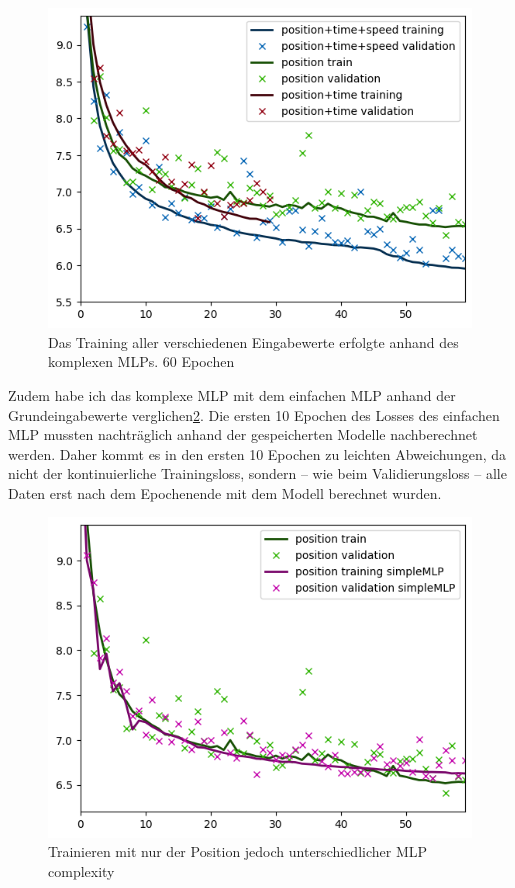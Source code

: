 \documentclass[a4paper]{article}
\begin{document}
    \begin{figure}[h]
        \includegraphics[scale=0.6]{figures/fig6_training_different_input_data}
        \centering
        \caption{Das Training aller verschiedenen Eingabewerte erfolgte anhand des komplexen MLPs. 60 Epochen}
        \label{fig:training_different_input}
    \end{figure}

    Zudem habe ich das komplexe MLP mit dem einfachen MLP anhand der Grundeingabewerte
    verglichen\ref{fig:training_different_complexity}. Die ersten 10 Epochen des Losses des einfachen MLP mussten
    nachträglich anhand der gespeicherten Modelle nachberechnet werden. Daher kommt es in den ersten 10 Epochen zu
    leichten Abweichungen, da nicht der kontinuierliche Trainingsloss, sondern – wie beim Validierungsloss – alle Daten
    erst nach dem Epochenende mit dem Modell berechnet wurden.


    \begin{figure}[h]
        \includegraphics[scale=0.6]{figures/fig7_training_different_mlp_complexity}
        \centering
        \caption{Trainieren mit nur der Position jedoch unterschiedlicher MLP complexity}
        \label{fig:training_different_complexity}
    \end{figure}
\end{document}
